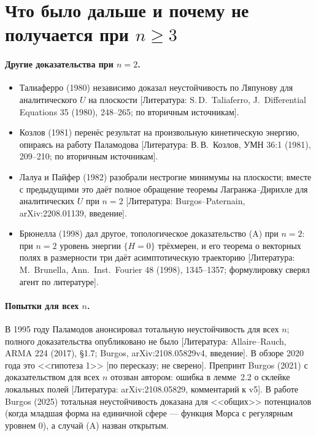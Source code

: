 \documentclass[11pt,a4paper]{article}
\theoremstyle{definition}
\newcommand{\mk}[1]{\textsf{[#1]}}
\begin{document}
\section{Что было дальше и почему не получается при $n\ge3$}\label{sec:after}

\paragraph{Другие доказательства при $n=2$.}
\begin{itemize}[leftmargin=*]
\item Талиаферро (1980) независимо доказал неустойчивость по Ляпунову для аналитического
$U$ на плоскости \mk{Литература: S.\,D.~Taliaferro, J.~Differential Equations 35 (1980),
248--265; по вторичным источникам}.
\item Козлов (1981) перенёс результат на произвольную кинетическую энергию, опираясь на работу
Паламодова \mk{Литература: В.\,В.~Козлов, УМН 36:1 (1981), 209--210; по вторичным источникам}.
\item Лалуа и Пайфер (1982) разобрали нестрогие минимумы на плоскости; вместе с предыдущими это
даёт полное обращение теоремы Лагранжа--Дирихле для аналитических $U$ при $n=2$
\mk{Литература: Burgos--Paternain, arXiv:2208.01139, введение}.
\item Брюнелла (1998) дал другое, топологическое доказательство (A) при $n=2$: при $n=2$ уровень
энергии $\{H=0\}$ трёхмерен, и его теорема о векторных полях в размерности три даёт
асимптотическую траекторию \mk{Литература: M.~Brunella, Ann.\ Inst.\ Fourier 48 (1998),
1345--1357; формулировку сверял агент по литературе}.
\end{itemize}

\paragraph{Попытки для всех $n$.} В 1995 году Паламодов анонсировал тотальную неустойчивость
для всех $n$; полного доказательства опубликовано не было \mk{Литература: Allaire--Rauch,
ARMA 224 (2017), §1.7; Burgos, arXiv:2108.05829v4, введение}. В обзоре 2020 года это
<<гипотеза 1>> \mk{по пересказу; не сверено}. Препринт Burgos (2021) с доказательством для всех
$n$ отозван автором: ошибка в лемме~2.2 о склейке локальных полей \mk{Литература: arXiv:2108.05829,
комментарий к v5}. В работе Burgos (2025) тотальная неустойчивость доказана для <<общих>>
потенциалов (когда младшая форма на единичной сфере --- функция Морса с регулярным уровнем $0$),
а случай (A) назван открытым.
\end{document}
